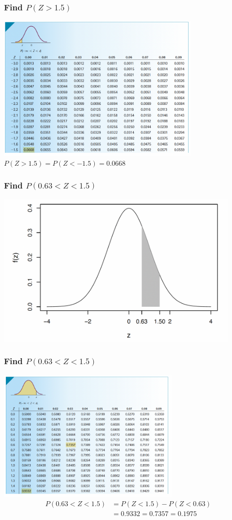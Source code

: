 \documentclass[12pt]{beamer}
\begin{document}
\begin{frame}
	\frametitle{Find $P(Z>1.5)$}
	\centering
	\includegraphics[width=10cm]{ztable4.png}
	$P(Z>1.5)=P(Z<-1.5)=0.0668$
\end{frame}
\begin{frame}
	\frametitle{Find $P(0.63<Z<1.5)$}
	\centering
	\includegraphics[width=12cm]{normal8.png}
\end{frame}
\begin{frame}
	\frametitle{Find $P(0.63<Z<1.5)$}
	\centering
	\includegraphics[width=9cm]{ztable5.png}
	\begin{align*}
		P(0.63<Z<1.5)&=P(Z<1.5)-P(Z<0.63)\\
		&=0.9332 =0.7357 = 0.1975
	\end{align*}
\end{frame}
\end{document}

